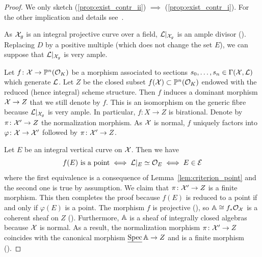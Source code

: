 \begin{proof}
    We only sketch (\ref{prop:exist_contr_ii}) $\implies$ (\ref{prop:exist_contr_i}).
    For the other implication and details see~\cite[Proposition 8.3.30]{Liu}.

    As $\X_g$ is an integral projective curve over a field, $\LL|_{\X_g}$
    is an ample divisor (\cite[Proposition 7.5.5]{Liu}). Replacing $D$ by a positive multiple (which
    does not change the set $E$), we can suppose that $\LL|_{\X_g}$ is very ample.

    Let $f \colon \X \to \PP^n(\OK )$ be a morphism associated to sections $s_0, \ldots, s_n \in \Gamma(\X, \LL)$ which generate $\LL$.
    Let $Z$ be the closed subset $f(\X) \subset \PP^n(\OK )$
    endowed with the reduced (hence integral) scheme structure.
    Then $f$ induces a dominant morphism $\X \to Z$ that we still denote by $f$.
    This is an isomorphism on the generic fibre because $\LL|_{\X_g}$ is very ample.
    In particular, $f \colon X \to Z$ is birational.
    Denote by $\pi \colon \X' \to Z$ the normalization morphism.
    As $\X$ is normal, $f$ uniquely factors into $\varphi \colon \X \to \X'$ followed by $\pi \colon \X' \to Z$.
    \begin{center}
    \end{center}
    Let $E$ be an integral vertical curve on $\X$. Then we have
    \[
        f(E) \textrm{ is a point} \iff \LL|_E \simeq \mathcal{O}_E \iff E \in \EE
    \]
    where the first equivalence is a consequence of Lemma~\ref{lem:criterion_point} and the second one is true by assumption.
    We claim that $\pi \colon \X' \to Z$ is a finite morphism.
    This then completes the proof because $f(E)$ is reduced to a point if and only if $\varphi(E)$ is a point.
    The morphism $f$ is projective (\cite[Corollary 3.3.32(e)]{Liu}), so $\AA \cong f_*\OO_\X$ is a coherent
    sheaf on $Z$ (\cite[Corollary 5.3.5]{Liu}). Furthermore, $\AA$ is a sheaf of integrally closed algebras because $\X$ is normal.
    As a result, the normalization morphism $\pi \colon \X' \to Z$
    coincides with the canonical morphism $\SpecRel \AA \to Z$ and is a finite morphism (\cite[Exercise 5.1.17]{Liu}).
\end{proof}


